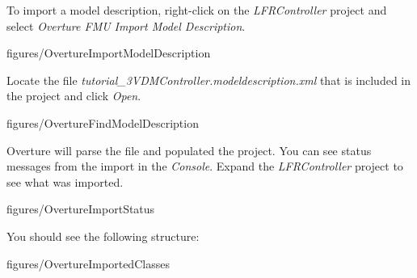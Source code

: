 \documentclass[11pt,a4paper]{../tutorial}
\begin{document}
\begin{instructions}

\item To import a model description, right-click on the \emph{LFRController} project and select \emph{Overture FMU \menusep Import Model Description}.

    \begin{annotation}[width=0.99\linewidth,trim=0 25 0 0,clip]{figures/OvertureImportModelDescription}
    \end{annotation}

\item Locate the file \emph{tutorial\_3\pathsep{}VDM\pathsep{}Controller.modeldescription.xml} that is included in the project and click \emph{Open}.


    \begin{annotation}[width=0.8\linewidth]{figures/OvertureFindModelDescription}
    \end{annotation}

\item Overture will parse the file and populated the project. You can see status messages from the import in the \emph{Console}. Expand the \emph{LFRController} project to see what was imported.

    \begin{annotation}[width=0.99\linewidth]{figures/OvertureImportStatus}
    \end{annotation}

    You should see the following structure:

    \begin{annotation}[width=0.25\linewidth,trim=0 300 535 0,clip]{figures/OvertureImportedClasses}
    \end{annotation}

\end{instructions}
\end{document}
